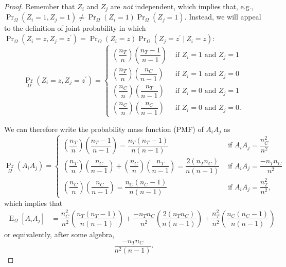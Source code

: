 \documentclass[12pt,leqno]{article}
\theoremstyle{newstyle}
\newcommand{\given}[1][]{\:#1\vert\:}
\DeclareMathOperator{\E}{\mathrm{E}}
\DeclareMathOperator{\Var}{\mathrm{Var}}
\newcommand{\EZ}{\E_{\Omega}}    \newcommand{\VarZ}{\Var_{\Omega}}  %
\renewcommand{\Pr}{\operatorname{Pr}}
\begin{document}
\begin{proof}
Remember that $Z_i$ and $Z_j$ are \textit{not} independent, which implies that, e.g., $\Pr_{\Omega}(Z_i = 1, Z_j = 1) \neq \Pr_{\Omega}(Z_i = 1) \Pr_{\Omega}(Z_j = 1)$. Instead, we will appeal to the definition of joint probability in which $\Pr_{\Omega}(Z_i = z, Z_j = z^{\prime}) = \Pr_{\Omega}(Z_i = z)\Pr_{\Omega}(Z_j = z^{\prime} \given Z_i = z)$:
\small
\begin{equation*}
\Pr_{\Omega}\left(Z_i = z, Z_j = z^{\prime}\right) = 
\begin{cases}
\left(\dfrac{n_T}{n}\right)\left(\dfrac{n_T - 1}{n - 1}\right) & \text{ if } Z_i = 1 \text{ and } Z_j = 1 \\[1ex]
\left(\dfrac{n_T}{n}\right)\left(\dfrac{n_C}{n - 1}\right) & \text{ if } Z_i = 1 \text{ and } Z_j = 0 \\[1ex]
\left(\dfrac{n_C}{n}\right)\left(\dfrac{n_T}{n - 1}\right) & \text{ if } Z_i = 0 \text{ and } Z_j = 1 \\[1ex]
\left(\dfrac{n_C}{n}\right)\left(\dfrac{n_C}{n - 1}\right) & \text{ if } Z_i = 0 \text{ and } Z_j = 0. 
\end{cases}
\end{equation*}
\normalsize

We can therefore write the probability mass function (PMF) of $A_i A_j$ as 
\small
\begin{equation*}
\Pr_{\Omega}\left(A_i A_j\right) = 
\begin{cases}
\left(\dfrac{n_T}{n}\right)\left(\dfrac{n_T - 1}{n - 1}\right) = \dfrac{n_T\left(n_T - 1\right)}{n\left(n - 1\right)}  & \text{ if } A_i A_j = \dfrac{n_C^2}{n^2} \\[1ex]
\left(\dfrac{n_T}{n}\right)\left(\dfrac{n_C}{n - 1}\right) + \left(\dfrac{n_C}{n}\right)\left(\dfrac{n_T}{n - 1}\right) = \dfrac{2\left(n_T n_C\right)}{n\left(n - 1\right)} & \text{ if } A_i A_j = \dfrac{-n_T n_C}{n^2} \\[1ex]
\left(\dfrac{n_C}{n}\right)\left(\dfrac{n_C}{n - 1}\right) = \dfrac{n_C\left(n_C - 1\right)}{n\left(n - 1\right)} & \text{ if } A_i A_j = \dfrac{n_T^2}{n^2},
\end{cases}
\end{equation*}
\normalsize
which implies that
\small
\begin{align*}
\EZ\left[A_i A_j\right] & = \dfrac{n_C^2}{n^2} \left(\dfrac{n_T\left(n_T - 1\right)}{n\left(n - 1\right)}\right) + \dfrac{-n_T n_C}{n^2} \left(\dfrac{2\left(n_T n_C\right)}{n\left(n - 1\right)}\right) + \dfrac{n_T^2}{n^2} \left(\dfrac{n_C\left(n_C - 1\right)}{n\left(n - 1\right)}\right)
\end{align*}
\normalsize
or equivalently, after some algebra, 
\small
\begin{equation*}
\dfrac{-n_T n_C}{n^2\left(n - 1\right)}.
\end{equation*}
\normalsize


\end{proof}
\end{document}
